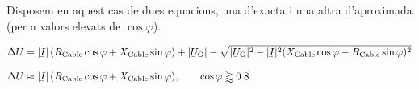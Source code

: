 Disposem en aquest cas de dues equacions, una d'exacta i una altra d'aproximada (per a valors elevats de $\cos \varphi$).

\begin{subequations}
\begin{align}
   \Delta U &= |\cmplx{I}| \,( R\ped{Cable} \cos \varphi + X\ped{Cable} \sin \varphi) + |\cmplx{U}\ped{O}| - \sqrt{|\cmplx{U}\ped{O}|^2 - |\cmplx{I}|^2 ( X\ped{Cable} \cos \varphi - R\ped{Cable} \sin \varphi )^2} \label{eq:cdt_trif_exact} \\[2ex]
   \Delta U &\approx |\cmplx{I}| \,( R\ped{Cable} \cos \varphi + X\ped{Cable} \sin \varphi), \qquad \cos \varphi \gtrapprox \num{0,8} \label{eq:cdt_trif_aprox}
\end{align}
\end{subequations}


